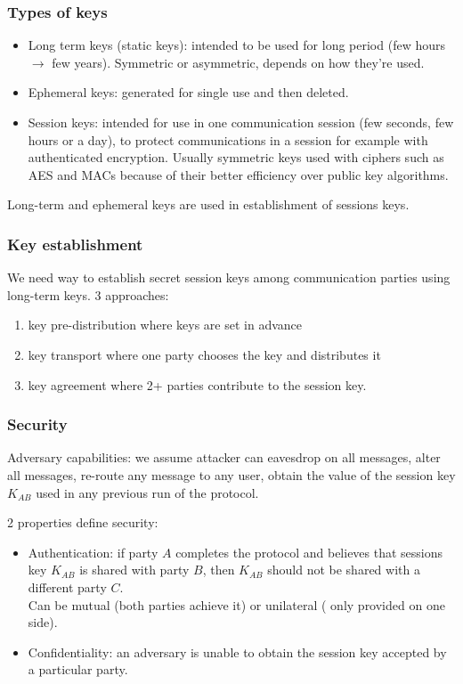 \documentclass{article}
\begin{document}
\subsubsection{Types of keys}

\begin{itemize}
    \item Long term keys (static keys): intended to be used for long period (few hours $\rightarrow$ few years). Symmetric or asymmetric, depends on how they're used.
    \item Ephemeral keys: generated for single use and then deleted.
    \item Session keys: intended for use in one communication session (few seconds, few hours or a day), to protect communications in a session for example with authenticated encryption. Usually symmetric keys used with ciphers such as AES and MACs because of their better efficiency over public key algorithms.
\end{itemize}
Long-term and ephemeral keys are used in establishment of sessions keys.

\subsubsection{Key establishment}

We need way to establish secret session keys among communication parties using long-term keys. 3 approaches:
\begin{enumerate}
    \item key pre-distribution where keys are set in advance
    \item key transport where one party chooses the key and distributes it
    \item key agreement where 2+ parties contribute to the session key.
\end{enumerate}

\subsubsection{Security}

Adversary capabilities: we assume attacker can eavesdrop on all messages, alter all messages, re-route any message to any user, obtain the value of the session key $K_{AB}$ used in any previous run of the protocol.

2 properties define security:
\begin{itemize}
    \item Authentication: if party $A$ completes the protocol and believes that sessions key $K_{AB}$ is shared with party $B$, then $K_{AB}$ should not be shared with a different party $C$.\\
    Can be mutual (both parties achieve it) or unilateral ( only provided on one side).
    \item Confidentiality: an adversary is unable to obtain the session key accepted by a particular party.
\end{itemize}
\end{document}
